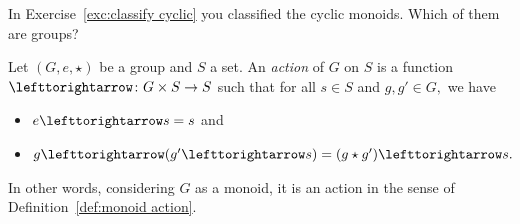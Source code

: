 \documentclass[CT4S-EN-RU]{subfiles}
\begin{document}
\begin{exerciseRUS}\label{exc:permutation}
\end{exerciseRUS}

\begin{exerciseENG}
In Exercise~\ref{exc:classify cyclic} you classified the cyclic monoids. Which of them are groups? 
\end{exerciseENG}

\begin{exerciseRUS}
\end{exerciseRUS}

\begin{definitionENG}\label{def:group action}
Let $(G,e,\star)$ be a group and $S$ a set. An {\em action} of $G$ on $S$ is a function $\acts\taking G\times S\to S$ such that for all $s\in S$ and $g,g'\in G,$ we have
\begin{itemize}
\item $e\acts s=s$ and
\item $g\acts(g'\acts s)=(g\star g')\acts s.$
\end{itemize}
In other words, considering $G$ as a monoid, it is an action in the sense of Definition~\ref{def:monoid action}.
\end{definitionENG}

\begin{definitionRUS}\label{def:group action}
\end{definitionRUS}
\end{document}
